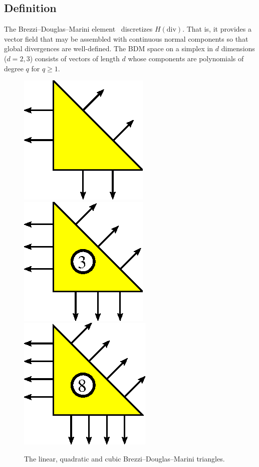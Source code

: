 \subsection{Definition}

The Brezzi--Douglas--Marini element~\cite{BrezziDouglasEtAl1985}
discretizes \( H(\mathrm{div}) \). That is, it provides a vector field
that may be assembled with continuous normal components so that global
divergences are well-defined.  The BDM space on a simplex in \( d \)
dimensions (\( d=2,3 \)) consists of vectors of length \( d \) whose
components are polynomials of degree \( q \) for
\( q \geq 1 \).

\begin{figure}[H]
  \begin{center}
    \includegraphics[width=\elementwidth]{chapters/kirby-6/eps/BDM1.eps}
    \includegraphics[width=\elementwidth]{chapters/kirby-6/eps/BDM2.eps}
    \includegraphics[width=\elementwidth]{chapters/kirby-6/eps/BDM3.eps}
    \caption{The linear, quadratic and cubic Brezzi--Douglas--Marini
      triangles.}
  \end{center}
\end{figure}

